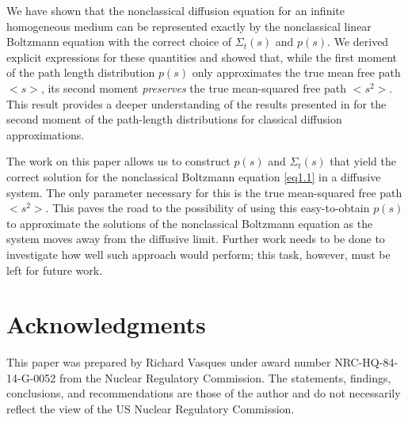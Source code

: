 \documentclass[preprint,12pt]{elsarticle}
\newcommand{\bl}{\big<}
\newcommand{\bg}{\big>}
\begin{document}
\setcounter{equation}{0} 

We have shown that the nonclassical diffusion equation for an infinite homogeneous medium can be represented exactly by the nonclassical linear Boltzmann equation with the correct choice of $\Sigma_t(s)$ and $p(s)$. We derived explicit expressions for these quantities and showed that, while the first moment of the path length distribution $p(s)$ only approximates the true mean free path $\bl s\bg$, its second moment \textit{preserves} the true mean-squared free path $\bl s^2\bg$. This result provides a deeper understanding of the results presented in \cite{siap15} for the second moment of the path-length distributions for classical diffusion approximations.

The work on this paper allows us to construct $p(s)$ and $\Sigma_t(s)$ that yield the correct solution for the nonclassical Boltzmann equation \eqref{eq1.1} in a diffusive system. The only parameter necessary for this is the true mean-squared free path $\bl s^2\bg$. This paves the road to the possibility of using this easy-to-obtain $p(s)$ to approximate the solutions of the nonclassical Boltzmann equation as the system moves away from the diffusive limit. Further work needs to be done to investigate how well such approach would perform; this task, however, must be left for future work.   

\section*{Acknowledgments}

This paper was prepared by Richard Vasques under award number NRC-HQ-84-14-G-0052 from the Nuclear Regulatory Commission. The statements, findings, conclusions, and recommendations are those of the author and do not necessarily reflect the view of the US Nuclear Regulatory Commission.
\end{document}

